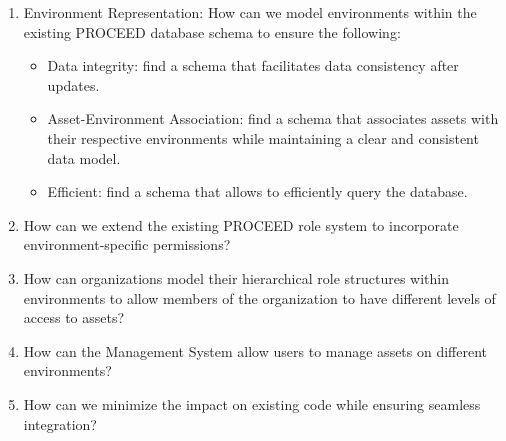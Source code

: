 \begin{enumerate}

\item Environment Representation: How can we model environments within the existing
  PROCEED database schema to ensure the following:
\begin{itemize}
  \item Data integrity: find a schema that facilitates data consistency after updates.
  \item Asset-Environment Association: find a schema that associates assets with their
    respective environments while maintaining a clear and consistent data model.
  \item Efficient: find a schema that allows to efficiently query the database.
\end{itemize}


\item How can we extend the existing PROCEED role system to incorporate
environment-specific permissions? 

\item How can organizations model their hierarchical role structures within environments
  to allow members of the organization to have different levels of access to assets?


\item How can the Management System allow users to manage assets on different
  environments?



\item How can we minimize the impact on existing code while ensuring seamless integration?


\end{enumerate}

